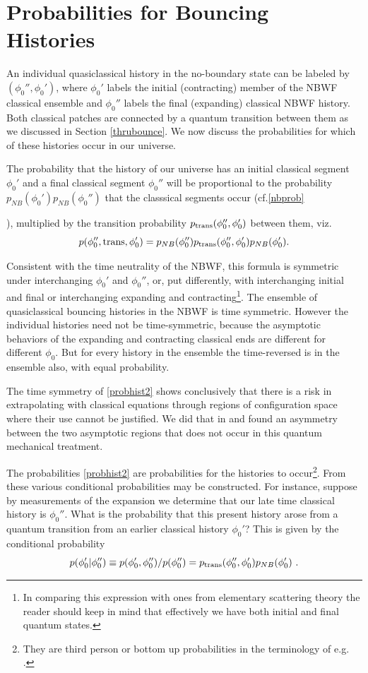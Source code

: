 \documentclass[prd,floats,superscriptaddress,eqsecnum,floatfix,nofootinbib,12pt]{revtex4}
\def\p0{\phi_0}
\def\pnb{p_{NB}}
\def\ptra{p_{\rm trans}(\p0'',\p0')}
\def\ptr{p_{\rm trans}}
\def\be{\begin{equation}}
\def\ee{\end{equation}}
\def\jf{}
\def\tf{}
\def\nf{}
\def\p0{\phi_0}
\begin{document}
{{{{%
\section{Probabilities for Bouncing Histories}
\label{probhist}


{An individual quasiclassical history in the no-boundary state can be labeled by $(\p0'',\p0')$, where $\p0'$ labels the initial (contracting) member of the NBWF classical ensemble and $\p0''$ labels the final (expanding) classical NBWF history. Both classical patches are connected by a quantum transition between them as we discussed in Section \ref{thrubounce}. We now discuss the probabilities for which of these histories occur in our universe. 

The probability that the history of  our universe has  {\jf an initial classical segment} $\p0'$ and a final classical segment $\p0''$ will be proportional to the probability $\pnb(\p0')\pnb(\p0'')$  that the classsical segments occur (cf.\eqref{nbprob}}),  multiplied by the transition probability $\ptra$ between them, viz. 
\be
\label{probhist2}
p(\p0'',{\rm trans},\p0') = \pnb(\p0'')p_{\rm trans}(\p0'',\p0')\pnb(\p0') .
\ee 
 
{\nf Consistent with the time neutrality of the NBWF}, this formula is symmetric under interchanging $\p0'$ and $\p0''$, or, put differently, with interchanging initial and final or interchanging expanding and contracting\footnote{\tf In comparing this expression with ones from elementary scattering theory the reader should keep in mind that effectively we have both initial and final quantum states.}. The ensemble of quasiclassical bouncing histories in the NBWF is time symmetric. However the individual histories {\nf need not be} time-symmetric, because the asymptotic behaviors of the expanding and contracting classical ends are different for {\nf different} $\p0$. But for every history in the ensemble the time-reversed is in the ensemble also, with equal probability. 

{\nf The time symmetry of \eqref{probhist2}} shows conclusively that there is a risk in extrapolating with classical equations through regions of configuration space where their use cannot be justified. We did that in \cite{HHH08a} and found an asymmetry between {\nf the two asymptotic regions} {\jf that does not occur in this quantum mechanical treatment.}

The probabilities \eqref{probhist2} are probabilities for the histories to occur\footnote{They are third person or bottom up probabilities in the terminology of e.g. \cite{HH15b}.}. From these various conditional probabilities may be constructed. For instance, suppose by measurements of the expansion we determine that our late time classical history is $\p0''$. What is the probability that this present history arose from a quantum transition from an earlier classical history $\p0'$? This is given by the conditional probability
\be
\label{bncpast}
p(\p0'|\p0'') \equiv p(\p0',\p0'')/p(\p0'') = \ptr(\p0'',\p0')\pnb(\p0') \ . 
\ee

}}}}
\end{document}
